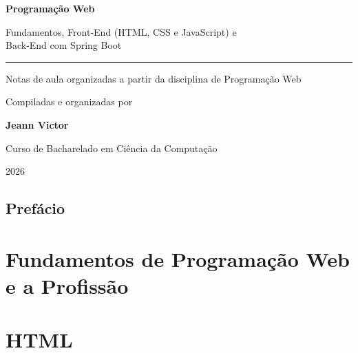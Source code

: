 \documentclass[12pt,a4paper,openany]{book}
\begin{document}
\begin{titlepage}
\centering
\vspace*{3cm}
{\Huge\bfseries\color{azullivro} Programação Web\par}
\vspace{1cm}
{\LARGE\color{laranjalivro} Fundamentos, Front-End (HTML, CSS e JavaScript) e\\Back-End com Spring Boot\par}
\vspace{2cm}\rule{0.65\textwidth}{0.4pt}\par\vspace{1.5cm}
{\Large Notas de aula organizadas a partir da disciplina de Programação Web\par}
\vspace{1cm}
{\large Compiladas e organizadas por\par}\vspace{0.3cm}
{\Large\bfseries Jeann Victor\par}
\vfill
{\large Curso de Bacharelado em Ciência da Computação\par}
{\large 2026\par}
\end{titlepage}
\frontmatter
\chapter*{Prefácio}

\tableofcontents
\mainmatter
\part{Fundamentos de Programação Web e a Profissão}










\part{HTML}




\end{document}
